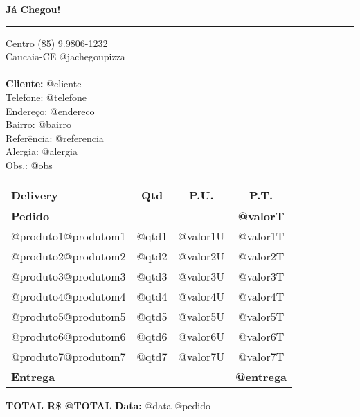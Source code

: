 \documentclass{article}
\begin{document}

\hfil{\large \bf Já Chegou!}\hfil %
\bigskip\break %
\hrule %

\noindent Centro \hfill (85) 9.9806-1232 \\ %
Caucaia-CE \hfill @jachegoupizza
\\ \\

{\bf \noindent Cliente:} @cliente \\ %
\noindent Telefone: @telefone \\ %
Endereço: @endereco \\
Bairro: @bairro \\
Referência: @referencia \\
Alergia: @alergia \\
Obs.: @obs\\

\begin{table}[!h]
    \centering
    \begin{tabularx}{\textwidth}{Xccc}
    \hline \textbf{Delivery\hfill} & \textbf{Qtd} & \textbf{P.U.} & \textbf{P.T.} \\
    \hline  \textbf{Pedido}     &       &          & \textbf{@valorT}  \\
            @produto1@produtom1 & @qtd1 & @valor1U & @valor1T \\
            @produto2@produtom2 & @qtd2 & @valor2U & @valor2T \\
            @produto3@produtom3 & @qtd3 & @valor3U & @valor3T \\
            @produto4@produtom4 & @qtd4 & @valor4U & @valor4T \\
            @produto5@produtom5 & @qtd5 & @valor5U & @valor5T \\
            @produto6@produtom6 & @qtd6 & @valor6U & @valor6T \\
            @produto7@produtom7 & @qtd7 & @valor7U & @valor7T \\
            \textbf{Entrega}    &       &          & \textbf{@entrega} \\ \hline
    \end{tabularx}
\end{table}
\hfill{\textbf{TOTAL R\$ @TOTAL}}
\vfill {\noindent \bf Data:} @data \hfill @pedido
\end{document}
